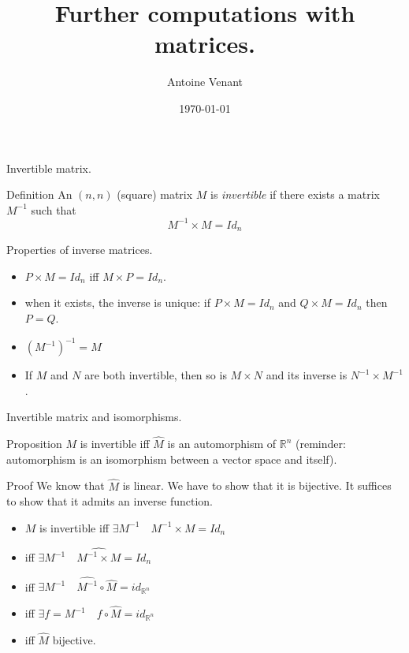 \documentclass{beamer}
\begin{document}
\title{Further computations with matrices.} 
\author{Antoine Venant}
\date{\today}

\maketitle

\begin{frame}{Invertible matrix.}

  \begin{block}{Definition}
    An $(n,n)$ (square) matrix $M$ is \emph{invertible} if there exists a matrix $M^{-1}$ such that
    \[ M^{-1} \times M = Id_n \]
  \end{block}

  \begin{block}{Properties of inverse matrices.}
    \begin{itemize}
    \item $P \times M = Id_n$ iff $M \times P = Id_n$.
    \item when it exists, the inverse is unique: if $P \times M = Id_n$ and $Q \times M = Id_n$ then $P = Q$.
    \item $(M^{-1})^{-1} = M$
    \item If $M$ and $N$ are both invertible, then so is $M \times N$ and its inverse is $N^{-1}\times M^{-1}$.
    \end{itemize}
  \end{block}
\end{frame}

\begin{frame}{Invertible matrix and isomorphisms.}
  \begin{block}{Proposition}
    $M$ is invertible iff $\widehat M$ is an automorphism of $\mathbb{R}^n$  (reminder: automorphism is an isomorphism between a vector space and itself).
  \end{block}

  \begin{exampleblock}{Proof}
    We know that $\widehat M$ is linear. We have to show that it is bijective. It suffices to show that it admits an inverse function.
    \begin{itemize}
    \item $M$ is invertible iff $\exists M^{-1}\quad M^{-1} \times M = Id_n$
    \item iff $\exists M^{-1} \quad \widehat{M^{-1} \times M} = \widehat{Id_n}$
    \item iff $\exists M^{-1} \quad \widehat{M^{-1}} \circ \widehat{M} = id_{\mathbb{R}^n}$
    \item iff $\exists f = M^{-1} \quad f \circ \widehat{M} = id_{\mathbb{R}^n}$
    \item iff $\widehat{M}$ bijective.
    \end{itemize}
  \end{exampleblock}

\end{frame}
\end{document}
